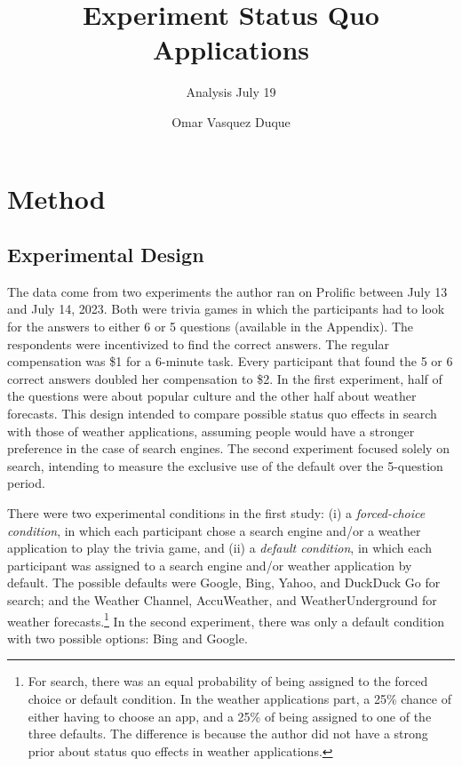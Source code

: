 \documentclass[
  11pt,
]{article}
\title{Experiment Status Quo Applications}
\subtitle{Analysis July 19}
\author{Omar Vasquez Duque}
\date{}
\begin{document}
\maketitle

\hypertarget{method}{%
\section{Method}\label{method}}

\hypertarget{experimental-design}{%
\subsection{Experimental Design}\label{experimental-design}}

The data come from two experiments the author ran on Prolific between July 13 and July 14, 2023. Both were trivia games in which the participants had to look for the answers to either 6 or 5 questions (available in the Appendix). The respondents were incentivized to find the correct answers. The regular compensation was \$1 for a 6-minute task. Every participant that found the 5 or 6 correct answers doubled her compensation to \$2. In the first experiment, half of the questions were about popular culture and the other half about weather forecasts. This design intended to compare possible status quo effects in search with those of weather applications, assuming people would have a stronger preference in the case of search engines. The second experiment focused solely on search, intending to measure the exclusive use of the default over the 5-question period.

There were two experimental conditions in the first study: (i) a \emph{forced-choice condition}, in which each participant chose a search engine and/or a weather application to play the trivia game, and (ii) a \emph{default condition}, in which each participant was assigned to a search engine and/or weather application by default. The possible defaults were Google, Bing, Yahoo, and DuckDuck Go for search; and the Weather Channel, AccuWeather, and WeatherUnderground for weather forecasts.\footnote{For search, there was an equal probability of being assigned to the forced choice or default condition. In the weather applications part, a 25\% chance of either having to choose an app, and a 25\% of being assigned to one of the three defaults. The difference is because the author did not have a strong prior about status quo effects in weather applications.} In the second experiment, there was only a default condition with two possible options: Bing and Google.
\end{document}

